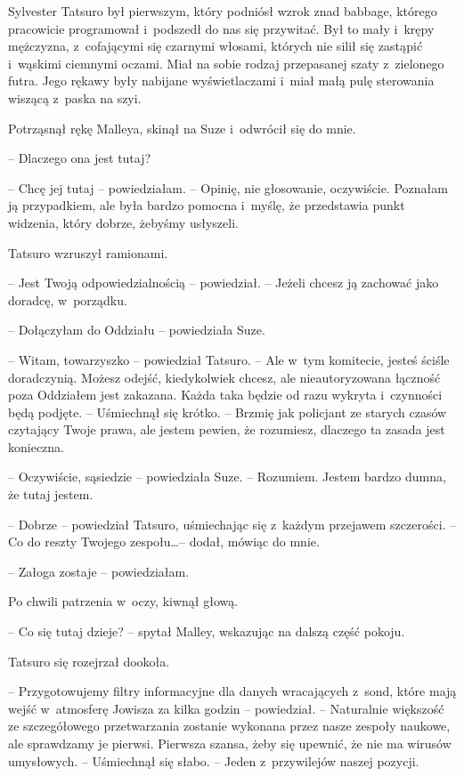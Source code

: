 \documentclass[oneside,polish,11pt,sfheadings]{mwbk}
\begin{document}
Sylvester Tatsuro był pierwszym, który podniósł wzrok znad babbage,
którego pracowicie programował i~podszedł do nas się przywitać. Był to
mały i~krępy mężczyzna, z~cofającymi się czarnymi włosami, których nie
silił się zastąpić i~wąskimi ciemnymi oczami. Miał na sobie rodzaj
przepasanej szaty z~zielonego futra. Jego rękawy były nabijane
wyświetlaczami i~miał małą pulę sterowania wiszącą z~paska na szyi.

Potrząsnął rękę Malleya, skinął na Suze i~odwrócił się do mnie.

-- Dlaczego ona jest tutaj?

-- Chcę jej tutaj -- powiedziałam. -- Opinię, nie głosowanie, oczywiście.
Poznałam ją przypadkiem, ale była bardzo pomocna i~myślę, że przedstawia
punkt widzenia, który dobrze, żebyśmy usłyszeli.

Tatsuro wzruszył ramionami. 

-- Jest Twoją odpowiedzialnością -- powiedział. -- Jeżeli chcesz ją zachować jako doradcę, w~porządku.

-- Dołączyłam do Oddziału -- powiedziała Suze.

-- Witam, towarzyszko -- powiedział Tatsuro. -- Ale w~tym komitecie, jesteś
ściśle doradczynią. Możesz odejść, kiedykolwiek chcesz, ale
nieautoryzowana łączność poza Oddziałem jest zakazana. Każda taka będzie
od razu wykryta i~czynności będą podjęte. -- Uśmiechnął się krótko. -- Brzmię jak policjant ze starych czasów czytający Twoje prawa, ale jestem
pewien, że rozumiesz, dlaczego ta zasada jest konieczna.

-- Oczywiście, sąsiedzie -- powiedziała Suze. -- Rozumiem. Jestem bardzo
dumna, że tutaj jestem.

-- Dobrze -- powiedział Tatsuro, uśmiechając się z~każdym przejawem
szczerości. -- Co do reszty Twojego zespołu\ldots  -- dodał, mówiąc do mnie.

-- Załoga zostaje -- powiedziałam.

Po chwili patrzenia w~oczy, kiwnął głową.

-- Co się tutaj dzieje? -- spytał Malley, wskazując na dalszą część
pokoju.

Tatsuro się rozejrzał dookoła. 

-- Przygotowujemy filtry informacyjne dla
danych wracających z~sond, które mają wejść w~atmosferę Jowisza za kilka
godzin -- powiedział. -- Naturalnie większość ze szczegółowego
przetwarzania zostanie wykonana przez nasze zespoły naukowe, ale
sprawdzamy je pierwsi. Pierwsza szansa, żeby się upewnić, że nie ma
wirusów umysłowych. -- Uśmiechnął się słabo. -- Jeden z~przywilejów naszej
pozycji.
\end{document}
